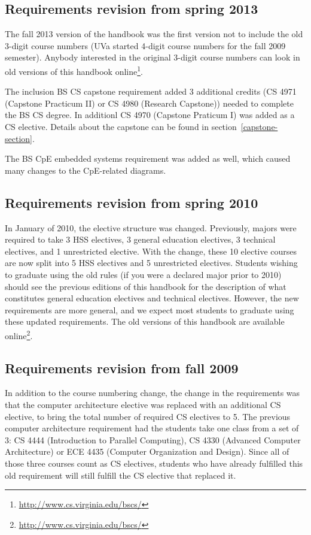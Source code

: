 \documentclass[10pt,letter]{book}
\newcommand{\myurl}[1]{\footnote{\scriptsize\url{#1}}}
\begin{document}
\subsection{Requirements revision from spring 2013}

The fall 2013 version of the handbook was the first version not to
include the old 3-digit course numbers (UVa started 4-digit course
numbers for the fall 2009 semester).  Anybody interested in the
original 3-digit course numbers can look in old versions of this
handbook online\myurl{http://www.cs.virginia.edu/bscs/}.

The inclusion BS CS capstone requirement added 3 additional credits
(CS 4971 (Capstone Practicum II) or CS 4980 (Research Capstone))
needed to complete the BS CS degree.  In additionl CS 4970 (Capstone
Praticum I) was added as a CS elective.  Details about the capstone
can be found in section~\ref{capstone-section}.

The BS CpE embedded systems requirement was added as well, which
caused many changes to the CpE-related diagrams.


\subsection{Requirements revision from spring 2010}

In January of 2010, the elective structure was changed. Previously,
majors were required to take 3 HSS electives, 3 general education
electives, 3 technical electives, and 1 unrestricted elective. With
the change, these 10 elective courses are now split into 5 HSS
electives and 5 unrestricted electives. Students wishing to graduate
using the old rules (if you were a declared major prior to 2010)
should see the previous editions of this handbook for the description
of what constitutes general education electives and technical
electives. However, the new requirements are more general, and we
expect most students to graduate using these updated requirements. The
old versions of this handbook are available
online\myurl{http://www.cs.virginia.edu/bscs/}.

\subsection{Requirements revision from fall 2009}

In addition to the course numbering change, the change in the
requirements was that the computer architecture elective was replaced
with an additional CS elective, to bring the total number of required
CS electives to 5. The previous computer architecture requirement had
the students take one class from a set of 3: CS 4444
(Introduction to Parallel Computing), CS 4330 (Advanced Computer
Architecture) or ECE 4435 (Computer Organization and
Design). Since all of those three courses count as CS electives,
students who have already fulfilled this old requirement will still
fulfill the CS elective that replaced it.
\end{document}
